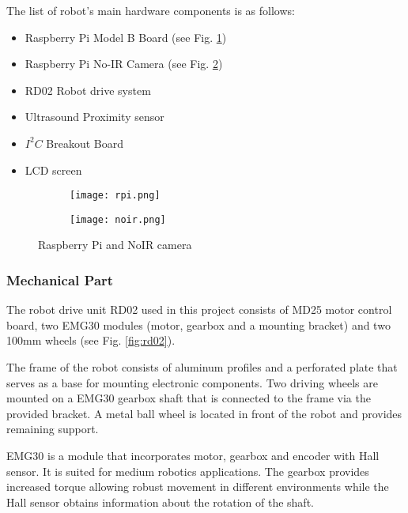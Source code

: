 The list of robot's main hardware components is as follows:

\begin{itemize}
  \item Raspberry Pi Model B Board (see Fig. \ref{fig:rpi_board})
  \item Raspberry Pi No-IR Camera (see Fig. \ref{fig:rpi_noir})
  \item RD02 Robot drive system
  \item Ultrasound Proximity sensor
  \item $I^2C$ Breakout Board
  \item LCD screen
\end{itemize}

\begin{figure}[h!]
\centering 

	\begin{subfigure}[h]{0.35\textwidth}
		\centering
			\texttt{[image: rpi.png]}
			\label{fig:rpi_board}
	\end{subfigure}
	\begin{subfigure}[h]{0.35\textwidth}
		\centering
			\texttt{[image: noir.png]}
			\label{fig:rpi_noir}
	\end{subfigure}

\caption{Raspberry Pi and NoIR camera}
\label{fig:rpi}
\end{figure}

\subsubsection{Mechanical Part} 

The robot drive unit RD02 used in this project consists of MD25 motor control
board, two EMG30 modules (motor, gearbox and a mounting bracket) and two 100mm
wheels\cite{robotel} (see Fig. \ref{fig:rd02}).

The frame of the robot consists of aluminum profiles and a perforated plate that
serves as a base for mounting electronic components. Two driving wheels
are mounted on a EMG30 gearbox shaft that is connected to the frame via the
provided bracket. A metal ball wheel is located in front of the robot and
provides remaining support.

EMG30 is a module that incorporates motor, gearbox and encoder with Hall sensor.
It is suited for medium robotics applications. The gearbox provides increased
torque allowing robust movement in different environments while the Hall sensor
obtains information about the rotation of the shaft.

